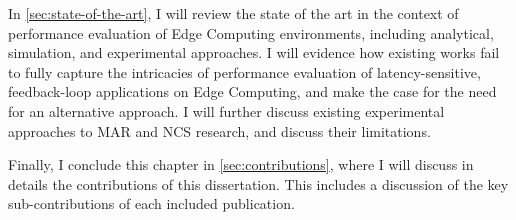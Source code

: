 \bigskip

In \cref{sec:state-of-the-art}, I will review the state of the art in the context of performance evaluation of Edge Computing environments, including analytical, simulation, and experimental approaches.
I will evidence how existing works fail to fully capture the intricacies of performance evaluation of latency-sensitive, feedback-loop applications on Edge Computing, and make the case for the need for an alternative approach.
I will further discuss existing experimental approaches to \gls{MAR} and \gls{NCS} research, and discuss their limitations.

Finally, I conclude this chapter in \cref{sec:contributions}, where I will discuss in details the contributions of this dissertation.
This includes a discussion of the key sub-contributions of each included publication.